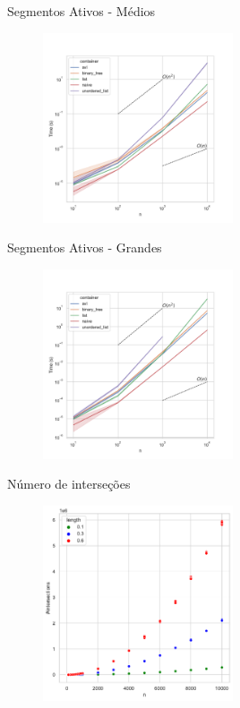 \documentclass[aspectratio=169,usenames,dvipsnames]{beamer}
\begin{document}
\begin{frame}{Segmentos Ativos - Médios}
      \begin{figure}
        \includegraphics[width=0.5\textwidth]{figs/tempos/plot_random_medium_time.pdf}
      \end{figure}
\end{frame}

\begin{frame}{Segmentos Ativos - Grandes}
      \begin{figure}
        \includegraphics[width=0.5\textwidth]{figs/tempos/plot_random_big_time.pdf}
      \end{figure}
\end{frame}

\begin{frame}{Número de interseções}
  \begin{figure}
    \includegraphics[width=0.5\textwidth]{figs/exemplos/n_intersections.pdf}
  \end{figure}
\end{frame}
\end{document}
